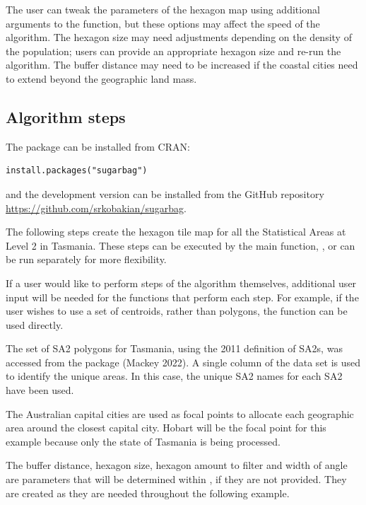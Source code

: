 The user can tweak the parameters of the hexagon map using additional arguments to the  function, but these options may affect the speed of the algorithm.
The hexagon size may need adjustments depending on the density of the population; users can provide an appropriate hexagon size and re-run the algorithm. The buffer distance may need to be increased if the coastal cities need to extend beyond the geographic land mass.

\hypertarget{algorithm-steps}{%
\subsection{Algorithm steps}\label{algorithm-steps}}

The package can be installed from CRAN:

\begin{verbatim}
install.packages("sugarbag")
\end{verbatim}

\noindent and the development version can be installed from the GitHub repository \url{https://github.com/srkobakian/sugarbag}.

The following steps create the hexagon tile map for all the Statistical Areas at Level 2 in Tasmania. These steps can be executed by the main function, , or can be run separately for more flexibility.

If a user would like to perform steps of the algorithm themselves, additional user input will be needed for the functions that perform each step. For example, if the user wishes to use a set of centroids, rather than polygons, the  function can be used directly.

The set of SA2 polygons for Tasmania, using the 2011 definition of SA2s, was accessed from the  package (Mackey 2022). A single column of the data set is used to identify the unique areas. In this case, the unique SA2 names for each SA2 have been used.

The Australian capital cities are used as focal points to allocate each geographic area around the closest capital city. Hobart will be the focal point for this example because only the state of Tasmania is being processed.

The buffer distance, hexagon size, hexagon amount to filter and width of angle are parameters that will be determined within , if they are not provided. They are created as they are needed throughout the following example.

